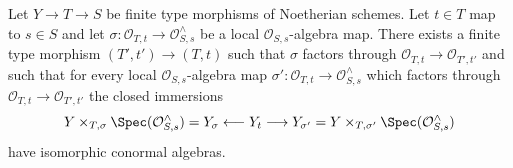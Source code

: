 %
\begin{lemma}
\label{lemma-control-graded}
Let $Y \to T \to S$ be finite type morphisms of Noetherian schemes.
Let $t \in T$ map to $s \in S$ and let
$\sigma : \mathcal{O}_{T, t} \to \mathcal{O}_{S, s}^\wedge$
be a local $\mathcal{O}_{S, s}$-algebra map.
There exists a finite type morphism $(T', t') \to (T, t)$
such that $\sigma$ factors through
$\mathcal{O}_{T, t} \to \mathcal{O}_{T', t'}$
and such that for every local $\mathcal{O}_{S, s}$-algebra map
$\sigma' : \mathcal{O}_{T, t} \to \mathcal{O}_{S, s}^\wedge$
which factors through $\mathcal{O}_{T, t} \to \mathcal{O}_{T', t'}$
the closed immersions
$$
Y \times_{T, \sigma} \Spec(\mathcal{O}_{S, s}^\wedge) = Y_\sigma
\longleftarrow Y_t \longrightarrow
Y_{\sigma'} =
Y \times_{T, \sigma'} \Spec(\mathcal{O}_{S, s}^\wedge)
$$
have isomorphic conormal algebras.
\end{lemma}

